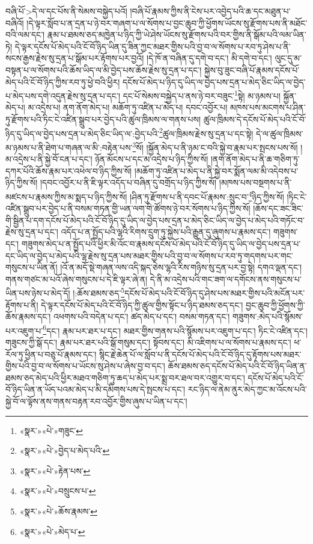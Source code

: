 བཞི་པོ་>དེ་ལ་དང་པོས་ནི་སེམས་བསྐྱེད་པའོ། །བཞི་པོ་རྣམས་ཀྱིས་ནི་ངེས་པར་འབྱེད་པའི་ཆ་དང་མཐུན་པ་བཞིའོ། །དེ་ལྟར་སློབ་པ་ན་དྲན་པ་ཉེ་བར་གཞག་པ་ལ་སོགས་པ་བྱང་ཆུབ་ཀྱི་ཕྱོགས་ཡོངས་སུ་རྫོགས་པས་ནི་མཐོང་བའི་ལམ་དང་། རྣམ་པ་ཐམས་ཅད་མཁྱེན་པ་ཉིད་ཀྱི་ཡེ་ཤེས་ཡོངས་སུ་རྫོགས་པའི་བར་གྱིས་ནི་སྒོམ་པའི་ལམ་ཡིན་ཏེ། དེ་ལྟར་དངོས་པོ་མེད་པའི་ངོ་བོ་ཉིད་ཡིན་དུ་ཟིན་ཀྱང་མཐར་གྱིས་པའི་བྱ་བ་ལ་སོགས་པ་རབ་ཏུ་ཤེས་པ་ནི་སངས་རྒྱས་རྗེས་སུ་དྲན་པ་སྒོམ་པར་རྟོགས་པར་བྱའོ། །དེ་ཁོ་ན་བཞིན་དུ་དགེ་བ་དང་། མི་དགེ་བ་དང་། ལུང་དུ་མ་བསྟན་པ་ལ་སོགས་པའི་ཆོས་ཡིད་ལ་མི་བྱེད་པས་ཆོས་རྗེས་སུ་དྲན་པ་དང་། སྐྱེས་བུ་ཟུང་བཞི་པོ་རྣམས་དངོས་པོ་མེད་པའི་ངོ་བོ་ཉིད་ཀྱིས་རབ་ཏུ་ཕྱེ་བའི་ཕྱིར། དངོས་པོ་མེད་པ་ཉིད་དུ་ཡིད་ལ་བྱེད་པས་དྲན་པ་མེད་ཅིང་ཡིད་ལ་བྱེད་པ་མེད་པས་དགེ་འདུན་རྗེས་སུ་དྲན་པ་དང་། དང་པོ་སེམས་བསྐྱེད་པ་ནས་ཉེ་བར་བཟུང་\footnote{«སྣར་»«པེ་»གཟུང་}སྟེ། མ་ཉམས་པ། སྐྱོན་མེད་པ། མ་འདྲེས་པ། ནག་ནོག་མེད་པ། མཆོག་ཏུ་འཛིན་པ་མེད་པ། དབང་འབྱོར་པ། མཁས་པས་མངགས་པ་ཤིན་ཏུ་རྫོགས་པའི་ཏིང་ངེ་འཛིན་སྒྲུབ་པར་བྱེད་པའི་ཚུལ་ཁྲིམས་ལ་གནས་པས། ཚུལ་ཁྲིམས་དེ་དངོས་པོ་མེད་པའི་ངོ་བོ་ཉིད་དུ་ཡིད་ལ་བྱེད་པས་དྲན་པ་མེད་ཅིང་ཡིད་ལ་:བྱེད་པའི་\footnote{«སྣར་»«པེ་»བྱེད་པ་མེད་པའི་}ཚུལ་ཁྲིམས་རྗེས་སུ་དྲན་པ་དང་སྟེ། དེ་ལ་ཚུལ་ཁྲིམས་མ་ཉམས་པ་ནི་ཐེག་པ་གཞན་ལ་མི་:བརྟེན་པས་\footnote{«སྣར་»«པེ་»རྟེན་པས་}སོ། །སྐྱོན་མེད་པ་ནི་ཉམ་ང་བའི་སྐྱེ་བ་རྣམ་པར་སྤངས་པས་སོ། །མ་འདྲེས་པ་ནི་སྐྱེ་བོ་ངན་པ་དང་། ཉོན་མོངས་པ་དང་མ་འདྲེས་པ་ཉིད་ཀྱིས་སོ། །ནག་ནོག་མེད་པ་ནི་ཆ་གཅིག་ཏུ་དཀར་པོའི་ཆོས་རྣམ་པར་འཕེལ་བ་ཉིད་ཀྱིས་སོ། །མཆོག་ཏུ་འཛིན་པ་མེད་པ་ནི་སྐྱེ་བར་སྨོན་ལམ་མི་འདེབས་པ་ཉིད་ཀྱིས་སོ། །དབང་འབྱོར་པ་ནི་ཇི་ལྟར་འདོད་པ་བཞིན་དུ་བགྲོད་པ་ཉིད་ཀྱིས་སོ། །མཁས་པས་བསྔགས་པ་ནི་མཛངས་པ་རྣམས་ཀྱིས་མ་སྨད་པ་ཉིད་ཀྱིས་སོ། །ཤིན་ཏུ་རྫོགས་པ་ནི་དབང་པོ་རྣམས་:སྲུང་བ་\footnote{«སྣར་»«པེ་»བསྲུངས་པ་}ཉིད་ཀྱིས་སོ། །ཏིང་ངེ་འཛིན་སྒྲུབ་པར་བྱེད་པ་ནི་བསམ་གཏན་གྱི་ཡན་ལག་གི་ཚོགས་ཉེ་བར་སོགས་པ་ཉིད་ཀྱིས་སོ། །ཆོས་དང་ཟང་ཟིང་གི་སྦྱིན་པ་དག་དངོས་པོ་མེད་པའི་ངོ་བོ་ཉིད་དུ་ཡིད་ལ་བྱེད་པས་དྲན་པ་མེད་ཅིང་ཡིད་ལ་བྱེད་པ་མེད་པའི་གཏོང་བ་རྗེས་སུ་དྲན་པ་དང་། འདོད་པ་ན་སྤྱོད་པའི་ལྷའི་རིགས་དྲུག་ཏུ་སྐྱེས་པའི་རྒྱུན་དུ་ཞུགས་པ་རྣམས་དང་། གཟུགས་དང་། གཟུགས་མེད་པ་ན་སྤྱོད་པའི་ཕྱིར་མི་འོང་བ་རྣམས་དངོས་པོ་མེད་པའི་ངོ་བོ་ཉིད་དུ་ཡིད་ལ་བྱེད་པས་དྲན་པ་དང་ཡིད་ལ་བྱེད་པ་མེད་པའི་ལྷ་རྗེས་སུ་དྲན་པས་མཐར་གྱིས་པའི་བྱ་བ་ལ་སོགས་པ་རབ་ཏུ་གདགས་པར་གང་གསུངས་པ་ཡིན་ནོ། །འོ་ན་མདོ་སྡེ་གཞན་ལས་འདི་སྐད་ཅེས་ལྷའི་རིས་གཉིས་སུ་དྲན་པར་བྱ་སྟེ། དགའ་ལྡན་དང་། གནས་གཙང་མ་པའོ་ཞེས་གསུངས་པ་དེ་ཇི་ལྟར་ཞེ་ན། དེ་ནི་མ་འདྲེས་པའི་གང་ཟག་ལ་དགོངས་ནས་གསུངས་པ་ཡིན་པས་ཉེས་པ་མེད་དོ། །:ཆོས་ཐམས་ཅད་\footnote{«སྣར་»«པེ་»ཆོས་རྣམས་}དངོས་པོ་མེད་པའི་ངོ་བོ་ཉིད་དུ་ཤེས་པས་མཐར་གྱིས་པའི་མངོན་པར་རྟོགས་པ་ནི། དེ་ལྟར་དངོས་པོ་མེད་པའི་ངོ་བོ་ཉིད་ཀྱི་ཚུལ་གྱིས་སྟོང་པ་ཉིད་ཐམས་ཅད་དང་། བྱང་ཆུབ་ཀྱི་ཕྱོགས་ཀྱི་ཆོས་རྣམས་དང་། འཕགས་པའི་བདེན་པ་དང་། ཚད་མེད་པ་དང་། བསམ་གཏན་དང་། གཟུགས་:མེད་པའི་སྙོམས་པར་འཇུག་པ་\footnote{«སྣར་»«པེ་»མེད་པ་}དང་། རྣམ་པར་ཐར་པ་དང་། མཐར་གྱིས་གནས་པའི་སྙོམས་པར་འཇུག་པ་དང་། ཏིང་ངེ་འཛིན་དང་། གཟུངས་ཀྱི་སྒོ་དང་། རྣམ་པར་ཐར་པའི་སྒོ་གསུམ་དང་། སྟོབས་དང་། མི་འཇིགས་པ་ལ་སོགས་པ་རྣམས་དང་། ཕ་རོལ་ཏུ་ཕྱིན་པ་བཅུ་པོ་རྣམས་དང་། སྙིང་རྗེ་ཆེན་པོ་ལ་སློབ་པ་ནི་དངོས་པོ་མེད་པའི་ངོ་བོ་ཉིད་དུ་རྟོགས་པས་མཐར་གྱིས་པའི་བྱ་བ་ལ་སོགས་པ་ཡོངས་སུ་ཤེས་པ་ཞེས་བྱ་བ་དང་། ཆོས་ཐམས་ཅད་དངོས་པོ་མེད་པའི་ངོ་བོ་ཉིད་ཡིན་ན་ཐམས་ཅད་མེད་པའི་ཕྱིར་མཐའ་གཅིག་ཏུ་ཆད་པ་མེད་པར་སྨྲ་བར་ཐལ་བར་འགྱུར་བ་དང་། དངོས་པོ་མེད་པའི་ངོ་བོ་ཉིད་ཡིན་ན་ཡོད་པའམ་མེད་པ་མི་དམིགས་པས་དེ་སྤངས་པ་དང་། རང་ཉིད་ལ་ནེམ་ནུར་མེད་ཀྱང་མ་འོངས་པའི་སྐྱེ་བོ་ལ་ལྟོས་ནས་གནས་བརྟན་རབ་འབྱོར་གྱིས་ཞུས་པ་ཡིན་པ་དང་། 
